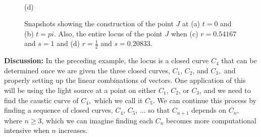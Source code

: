 \documentclass[12pt,a4paper]{article}%
\begin{document}
\begin{figure}
\begin{center}
{\begin{center}
\\
(d)
\end{center}}
\end{center}
\caption{Snapshots showing the construction of the point $J$ at (a) $t=0$ and (b) $t=pi$.
               Also, the entire locus of  the point $J$
               when (c) $r=0.54167$ and $s=1$ and (d) $r=\frac{1}{2}$ and $s=0.20833$.
}
\label{fig8}
\end{figure}

\textbf{Discussion: }
In the preceding example, the locus is a closed curve $C_{4}$
that can be determined once we are given the three closed curves,
$C_{1}$, $C_{2}$, and $C_{3},$ and properly setting up the linear combinations of vectors. One
application of this will be using the light source at a point on either
$C_{1}$, $C_{2}$, or $C_{3}$, and we need to find the caustic curve of $C_{4},$
which we call it $C_{5}.$ We can continue this process by finding a sequence of
closed curves, $C_{4}$, $C_{5}$, ... so that $C_{n+1}$ depends on $C_{n}$, where
$n\geq3$, which we can imagine finding each $C_{n}$ becomes more computational
intensive when $n$ increases.
\end{document}
